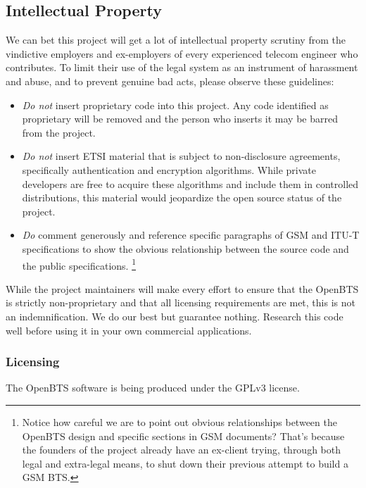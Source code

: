\documentclass[11pt]{book}
\begin{document}
\subsection{Intellectual Property}
We can bet this project will get a lot of intellectual property scrutiny from the vindictive employers and ex-employers of every experienced telecom engineer who contributes.  To limit their use of the legal system as an instrument of harassment and abuse, and to prevent genuine bad acts, please observe these guidelines:
\begin{itemize}
	\item \emph{Do not} insert proprietary code into this project. Any code identified as proprietary will be removed and the person who inserts it may be barred from the project.
	\item \emph{Do not} insert ETSI material that is subject to non-disclosure agreements, specifically authentication and encryption algorithms.  While private developers are free to acquire these algorithms and include them in controlled distributions, this material would jeopardize the open source status of the project.
	\item \emph{Do} comment generously and reference specific paragraphs of GSM and ITU-T specifications to show the obvious relationship between the source code and the public specifications.%
	\footnote{Notice how careful we are to point out obvious relationships between the OpenBTS design and specific sections in GSM documents?  That's because the founders of the project already have an ex-client trying, through both legal and extra-legal means, to shut down their previous attempt to build a GSM BTS.}
\end{itemize}
While the project maintainers will make every effort to ensure that the OpenBTS is strictly non-proprietary and that all licensing requirements are met, this is not an indemnification. We do our best but guarantee nothing. Research this code well before using it in your own commercial applications.

\subsubsection{Licensing}
\label{sec:GPLUse}
The OpenBTS software is being produced under the GPLv3 license.
\end{document}
